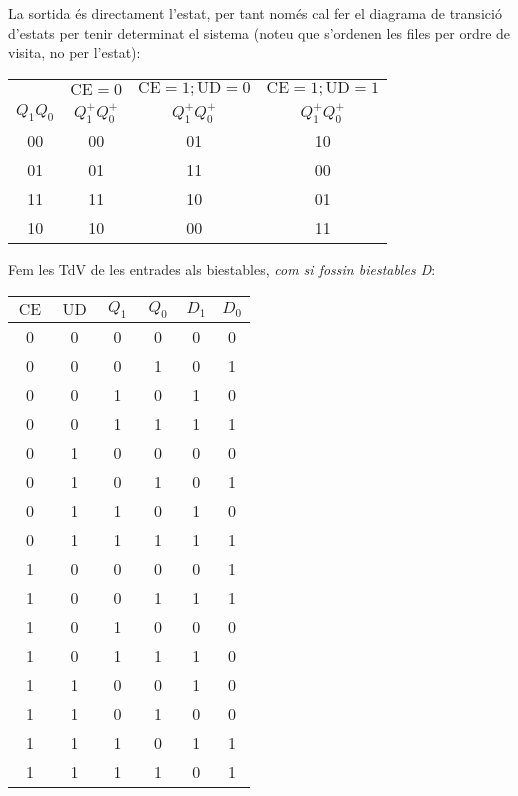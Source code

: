 

\newcommand{\nodenamebit}[1]{\textsf{#1}}
\newcommand{\nodenamesingle}[2]{\textsf{#1}_\textsf{#2}}
\newcommand{\nodenamerange}[3]{\textsf{#1}_\textsf{#2..#3}}


\startpage


La sortida és directament l'estat, per tant només cal fer el diagrama de transició d'estats
per tenir determinat el sistema (noteu que s'ordenen les files per ordre de visita, no per l'estat):

\begin{center} \begin{tabular}{cccc} \toprule
          & $\text{CE} = 0$           & $\text{CE} = 1; \text{UD} = 0$   & $\text{CE} = 1; \text{UD} = 1$  \\
\cmidrule(){2-2} \cmidrule(rl){3-3} \cmidrule(){4-4}
$Q_1Q_0$  &  $Q^{+}_1Q^{+}_0$  &  $Q^{+}_1Q^{+}_0$  &  $Q^{+}_1Q^{+}_0$ \\
\midrule
00  &  00  &  01  &  10 \\
01  &  01  &  11  &  00 \\
11  &  11  &  10  &  01 \\
10  &  10  &  00  &  11 \\
\bottomrule
\end{tabular} \end{center}

Fem les TdV de les entrades als biestables, \emph{com si fossin biestables D}:

\begin{center} \begin{tabular}{c@{}c@{}c@{}ccc} \toprule
$\,\text{CE}\,$ & $\,\text{UD}\,$ & $\,Q_1\,$ & $\,Q_0\,$ & $D_1$ & $D_0$ \\
\midrule
0 & 0  &  0 & 0  &  0  &  0  \\
0 & 0  &  0 & 1  &  0  &  1  \\
0 & 0  &  1 & 0  &  1  &  0  \\
0 & 0  &  1 & 1  &  1  &  1  \\
0 & 1  &  0 & 0  &  0  &  0  \\
0 & 1  &  0 & 1  &  0  &  1  \\
0 & 1  &  1 & 0  &  1  &  0  \\
0 & 1  &  1 & 1  &  1  &  1  \\
1 & 0  &  0 & 0  &  0  &  1  \\
1 & 0  &  0 & 1  &  1  &  1  \\
1 & 0  &  1 & 0  &  0  &  0  \\
1 & 0  &  1 & 1  &  1  &  0  \\
1 & 1  &  0 & 0  &  1  &  0  \\
1 & 1  &  0 & 1  &  0  &  0  \\
1 & 1  &  1 & 0  &  1  &  1  \\
1 & 1  &  1 & 1  &  0  &  1  \\
\bottomrule
\end{tabular} \end{center}


